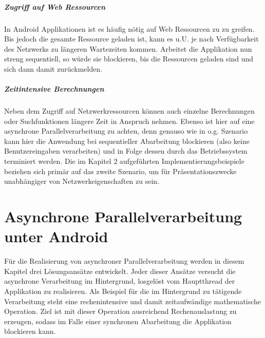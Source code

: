 \documentclass[12pt,oneside,a4paper,bibtotoc,liststotoc]{scrreprt}
\begin{document}
\paragraph{Zugriff auf Web Ressourcen} 
In Android Applikationen ist es häufig nötig auf Web Ressourcen zu zu greifen. Bis jedoch die gesamte Ressource geladen ist, kann es u.U. je nach Verfügbarkeit des Netzwerks zu längeren Wartezeiten kommen. Arbeitet die Applikation nun streng sequentiell, so würde sie blockieren, bis die Ressourcen geladen sind und sich dann damit zurückmelden.
\paragraph{Zeitintensive Berechnungen}
Neben dem Zugriff auf Netzwerkressourcen können auch einzelne Berechnungen oder Suchfunktionen längere Zeit in Anspruch nehmen. Ebenso ist hier auf eine asynchrone Parallelverarbeitung zu achten, denn genauso wie in o.g. Szenario kann hier die Anwendung bei sequentieller Abarbeitung blockieren (also keine Benutzereingaben verarbeiten) und in Folge dessen durch das Betriebssystem terminiert werden. 
\newline
Die im Kapitel 2 aufgeführten Implementierungsbeispiele beziehen sich primär auf das zweite Szenario, um für Präsentationszwecke unabhängiger von Netzwerkeigenschaften zu sein.


\chapter{Asynchrone Parallelverarbeitung unter Android}
Für die Realisierung von asynchroner Parallelverarbeitung werden in diesem Kapitel drei Lösungsansätze entwickelt. Jeder dieser Ansätze versucht die asynchrone Verarbeitung im Hintergrund, losgelöst vom Hauptthread der Applikation zu realisieren. Als Beispiel für die im Hintergrund zu tätigende Verarbeitung steht eine rechenintensive und damit zeitaufwändige mathematische Operation. Ziel ist mit dieser Operation ausreichend Rechenauslastung zu erzeugen, sodass im Falle einer synchronen Abarbeitung die Applikation blockieren kann.
\end{document}
